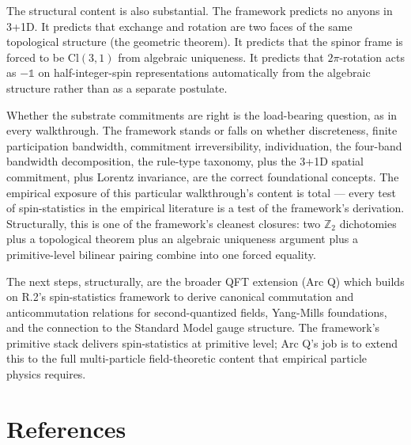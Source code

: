 \documentclass[11pt,a4paper]{article}
\begin{document}
The structural content is also substantial. The framework predicts no anyons in 3+1D. It predicts that exchange and rotation are two faces of the same topological structure (the geometric theorem). It predicts that the spinor frame is forced to be $\mathrm{Cl}(3,1)$ from algebraic uniqueness. It predicts that $2\pi$-rotation acts as $-\mathbb{1}$ on half-integer-spin representations automatically from the algebraic structure rather than as a separate postulate.

Whether the substrate commitments are right is the load-bearing question, as in every walkthrough. The framework stands or falls on whether discreteness, finite participation bandwidth, commitment irreversibility, individuation, the four-band bandwidth decomposition, the rule-type taxonomy, plus the 3+1D spatial commitment, plus Lorentz invariance, are the correct foundational concepts. The empirical exposure of this particular walkthrough's content is total --- every test of spin-statistics in the empirical literature is a test of the framework's derivation. Structurally, this is one of the framework's cleanest closures: two $\mathbb{Z}_2$ dichotomies plus a topological theorem plus an algebraic uniqueness argument plus a primitive-level bilinear pairing combine into one forced equality.

The next steps, structurally, are the broader QFT extension (Arc Q) which builds on R.2's spin-statistics framework to derive canonical commutation and anticommutation relations for second-quantized fields, Yang-Mills foundations, and the connection to the Standard Model gauge structure. The framework's primitive stack delivers spin-statistics at primitive level; Arc Q's job is to extend this to the full multi-particle field-theoretic content that empirical particle physics requires.

\section{References}
\end{document}
